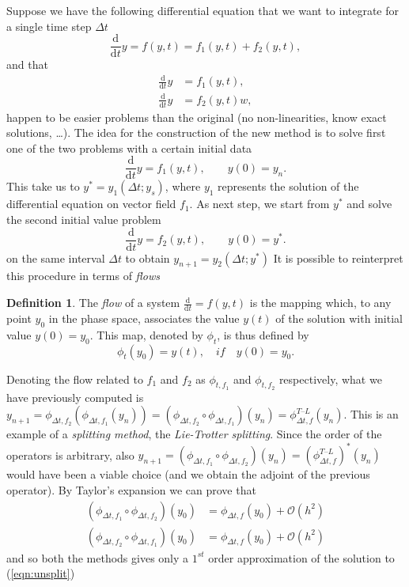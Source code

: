 \documentclass[a4paper,11pt ]{report}
\theoremstyle{definition}
\newtheorem{definition}{Definition}
\begin{document}
Suppose we have the following differential equation that we want to integrate for a single time step $\Delta t$
\begin{equation}
\frac{\text{d}}{\text{d}t}y=f(y,t)=f_1(y,t)+f_2(y,t),\label{eqn:unsplit}
\end{equation}
and that
\begin{align*}
\frac{\text{d}}{\text{d} t}y &= f_1(y,t),\\
\frac{\text{d}}{\text{d} t}y &= f_2(y,t)w,
\end{align*}
happen to be easier problems than the original (no non-linearities, know exact solutions, \dots).
The idea for the construction of the new method is to solve first one of the two problems with a certain initial data
\begin{equation*}
\frac{\text{d}}{\text{d}t}y=f_1(y,t), \qquad y(0)=y_n.
\end{equation*}
This take us to $y^*=y_1(\Delta t;y_s)$, where $y_1$ represents the solution of the differential equation on vector field $f_1$. As next step, we start from $y^*$ and solve the second initial value problem
\begin{equation*}
\frac{\text{d}}{\text{d}t}y=f_2(y,t), \qquad y(0)=y^*.
\end{equation*}
on the same interval $\Delta t$ to obtain $y_{n+1}=y_2(\Delta t;y^*)$
It is possible to reinterpret this procedure in terms of \textit{flows}\cite{Hairer_1}
\theoremstyle{definition}
\begin{definition}{}
The \textit{flow} of a system $\frac{\text{d}}{\text{d} t}=f(y,t)$ is the mapping which, to any point $y_0$ in the phase space, associates the value $y(t)$ of the solution with initial value $y(0)=y_0$. This map, denoted by $\phi_t$, is thus defined by
\begin{equation*}
\phi_t(y_0)=y(t), \quad if \quad y(0)=y_0.
\end{equation*}
\end{definition}{}
Denoting the flow related to $f_1$ and $f_2$ as $\phi_{t,f_1}$ and $\phi_{t,f_2}$ respectively, what we have previously computed is $y_{n+1}=\phi_{\Delta t,f_2}(\phi_{\Delta t,f_1}(y_n))=(\phi_{\Delta t,f_2}\circ\phi_{\Delta t,f_1})(y_n)=\phi^{T\text{--}L}_{\Delta t, f}(y_n)$. This is an example of a \textit{splitting method}, the \textit{Lie-Trotter splitting}. Since the order of the operators is arbitrary, also $y_{n+1}=(\phi_{\Delta t,f_1}\circ\phi_{\Delta t,f_2})(y_n)=(\phi^{{T\text{--}L}}_{\Delta t, f})^*(y_n)$ would have been a viable choice (and we obtain the adjoint of the previous operator). By Taylor's expansion we can prove that
\begin{align*}
(\phi_{\Delta t,f_1}\circ\phi_{\Delta t,f_2})(y_0)&=\phi_{\Delta t,f}(y_0)+\mathcal{O}(h^2)\\
(\phi_{\Delta t,f_2}\circ\phi_{\Delta t,f_1})(y_0)&=\phi_{\Delta t,f}(y_0)+\mathcal{O}(h^2)
\end{align*}
and so both the methods gives only a $1^{st}$ order approximation of the solution to (\ref{eqn:unsplit})
\end{document}
